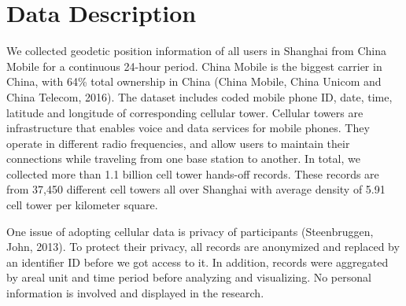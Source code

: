 \documentclass[hidelinks,12pt]{article}
\begin{document}
	\section{Data Description}\label{sec:data}
We collected geodetic position information of all users in Shanghai from China Mobile for a continuous 24-hour period. China Mobile is the biggest carrier in China, with 64\% total ownership in China (China Mobile, China Unicom and China Telecom, 2016). The dataset includes coded mobile phone ID, date, time, latitude and longitude of corresponding cellular tower. Cellular towers are infrastructure that enables voice and data services for mobile phones. They operate in different radio frequencies, and allow users to maintain their connections while traveling from one base station to another. In total, we collected more than 1.1 billion cell tower hands-off records. These records are from 37,450 different cell towers all over Shanghai with average density of 5.91 cell tower per kilometer square.

One issue of adopting cellular data is privacy of participants (Steenbruggen, John, 2013). To protect their privacy, all records are anonymized and replaced by an identifier ID before we got access to it. In addition, records were aggregated by areal unit and time period before analyzing and visualizing. No personal information is involved and displayed in the research.
\end{document}
